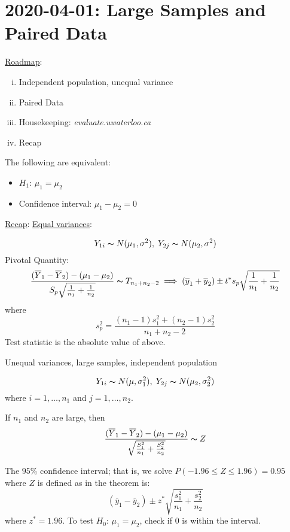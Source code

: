 \section{2020-04-01: Large Samples and Paired Data}
\underline{Roadmap}:
\begin{enumerate}[(i)]
    \item Independent population, unequal variance
    \item Paired Data
    \item Housekeeping: \emph{evaluate.uwaterloo.ca}
    \item Recap
\end{enumerate}

The following are equivalent:
\begin{itemize}
    \item $ H_1 $: $ \mu_1=\mu_2 $
    \item Confidence interval: $ \mu_1-\mu_2=0 $
\end{itemize}

\underline{Recap}: \underline{Equal variances}:

\[ Y_{1i} \thicksim N(\mu_1,\sigma^2),\; Y_{2j} \thicksim N(\mu_2,\sigma^2) \]
Pivotal Quantity:
\[ \frac{(\overline{Y}_1-\overline{Y}_2)-(\mu_1-\mu_2)}{S_p \sqrt{\frac{1}{n_1}+\frac{1}{n_2}}}
    \thicksim T_{n_1+n_2-2}\implies (\overline{y}_1+\overline{y}_2)\pm t^* s_p\sqrt{\frac{1}{n_1}+\frac{1}{n_2}}  \]
where
\[ s_p^2=\frac{(n_1-1)s_1^2+(n_2-1)s_2^2}{n_1+n_2-2}  \]
Test statistic is the absolute value of above.

Unequal variances, large samples, independent population

\[ Y_{1i}\thicksim N(\mu,\sigma_1^2),\; Y_{2j} \thicksim N(\mu_2,\sigma_2^2) \]
where $ i=1,\ldots ,n_1 $ and $ j=1,\ldots ,n_2 $.
\begin{thmbox}
    \begin{theorem}
        If $ n_1 $ and $ n_2 $ are large, then
        \[ \frac{(\overline{Y}_1-\overline{Y}_2)-(\mu_1-\mu_2)}{\sqrt{\frac{S_1^2}{n_1}+\frac{S_2^2}{n_2}}}
            \thicksim Z  \]
    \end{theorem}
\end{thmbox}
The $ 95\% $ confidence interval; that is, we solve $ P(-1.96\leqslant Z \leqslant 1.96)=0.95 $
where $ Z $ is defined as in the theorem is:
\[ (\overline{y}_1-\overline{y}_2)\pm z^*\sqrt{\frac{s_1^2}{n_1}+\frac{s_2^2}{n_2}} \]
where $ z^*=1.96 $. To test $ H_0 $: $ \mu_1=\mu_2 $, check if $ 0 $ is within the interval.

